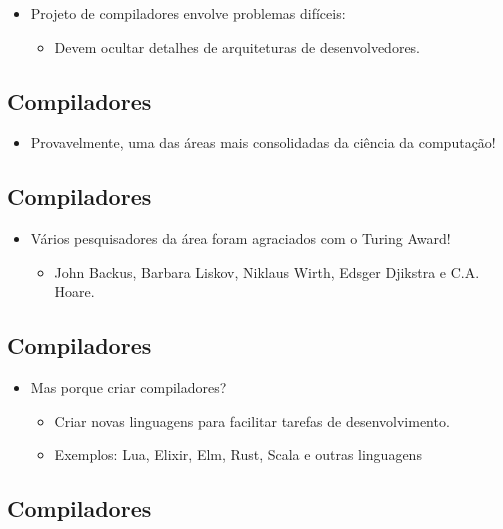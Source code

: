 \documentclass[11pt]{article}
\begin{document}
\begin{itemize}
\item Projeto de compiladores envolve problemas difíceis:
\begin{itemize}
\item Devem ocultar detalhes de arquiteturas de desenvolvedores.
\end{itemize}
\end{itemize}
\subsection*{Compiladores}
\label{sec:org8f7378a}

\begin{itemize}
\item Provavelmente, uma das áreas mais consolidadas da ciência da computação!
\end{itemize}
\subsection*{Compiladores}
\label{sec:org3e72f21}

\begin{itemize}
\item Vários pesquisadores da área foram agraciados com o Turing Award!
\begin{itemize}
\item John Backus, Barbara Liskov, Niklaus Wirth, Edsger Djikstra e C.A. Hoare.
\end{itemize}
\end{itemize}
\subsection*{Compiladores}
\label{sec:org85233e7}

\begin{itemize}
\item Mas porque criar compiladores?
\begin{itemize}
\item Criar novas linguagens para facilitar tarefas de desenvolvimento.
\item Exemplos: Lua, Elixir, Elm, Rust, Scala e outras linguagens
\end{itemize}
\end{itemize}
\subsection*{Compiladores}
\label{sec:org9d266e0}
\end{document}
